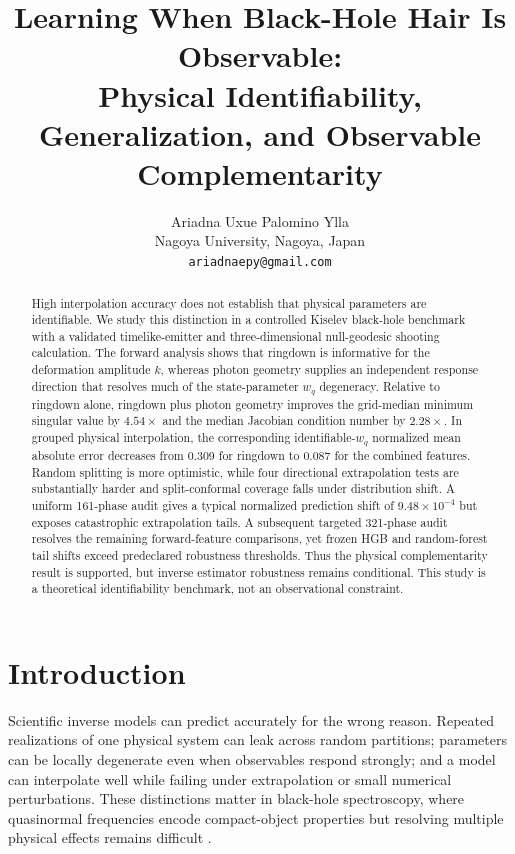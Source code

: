\documentclass[11pt]{article}
\title{Learning When Black-Hole Hair Is Observable:\\Physical Identifiability, Generalization, and Observable Complementarity}
\author{Ariadna Uxue Palomino Ylla\\Nagoya University, Nagoya, Japan\\\texttt{ariadnaepy@gmail.com}}
\date{}
\newcommand{\wq}{w_q}
\begin{document}
\maketitle

\begin{abstract}
High interpolation accuracy does not establish that physical parameters are
identifiable. We study this distinction in a controlled Kiselev black-hole
benchmark with a validated timelike-emitter and three-dimensional null-geodesic
shooting calculation. The forward analysis shows that ringdown is informative
for the deformation amplitude $k$, whereas photon geometry supplies an
independent response direction that resolves much of the state-parameter
$\wq$ degeneracy. Relative to ringdown alone, ringdown plus photon geometry
improves the grid-median minimum singular value by $4.54\times$ and the median
Jacobian condition number by $2.28\times$. In grouped physical interpolation,
the corresponding identifiable-$\wq$ normalized mean absolute error decreases
from 0.309 for ringdown to 0.087 for the combined features. Random splitting is
more optimistic, while four directional extrapolation tests are substantially
harder and split-conformal coverage falls under distribution shift. A uniform
161-phase audit gives a typical normalized prediction shift of
$9.48\times10^{-4}$ but exposes catastrophic extrapolation tails. A subsequent
targeted 321-phase audit resolves the remaining forward-feature comparisons,
yet frozen HGB and random-forest tail shifts exceed predeclared robustness
thresholds. Thus the physical complementarity result is supported, but inverse
estimator robustness remains conditional. This study is a theoretical
identifiability benchmark, not an observational constraint.
\end{abstract}

\section{Introduction}
Scientific inverse models can predict accurately for the wrong reason. Repeated
realizations of one physical system can leak across random partitions;
parameters can be locally degenerate even when observables respond strongly;
and a model can interpolate well while failing under extrapolation or small
numerical perturbations. These distinctions matter in black-hole spectroscopy,
where quasinormal frequencies encode compact-object properties but resolving
multiple physical effects remains difficult \cite{dreyer2004spectroscopy,berti2006spectroscopy,bhagwat2019overtones}.
\end{document}
